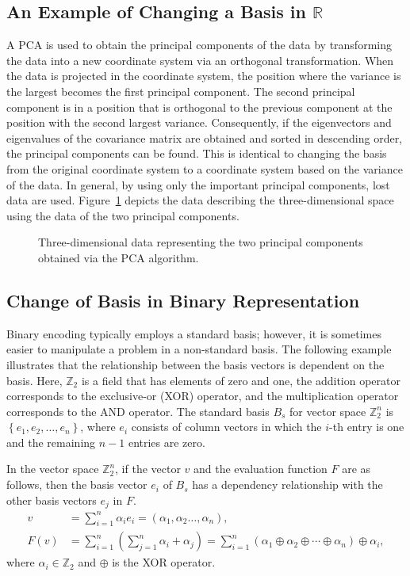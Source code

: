 \subsection{An Example of Changing a Basis in $\mathbb{R}$}
A PCA is used to obtain the principal components of the data by transforming the data into a new coordinate system via an orthogonal transformation. When the data is projected in the coordinate system, the position where the variance is the largest becomes the first principal component. The second principal component is in a position that is orthogonal to the previous component at the position with the second largest variance. Consequently, if the eigenvectors and eigenvalues of the covariance matrix are obtained and sorted in descending order, the principal components can be found. This is identical to changing the basis from the original coordinate system to a coordinate system based on the variance of the data. In general, by using only the important principal components, lost data are used. Figure~\ref{fig:pca} depicts the data describing the three-dimensional space using the data of the two principal components.

\begin{figure} [ht!]
	\caption{Three-dimensional data representing the two principal components obtained via the PCA algorithm.} \label{fig:pca}
\end{figure}

\subsection{Change of Basis in Binary Representation} \label{sec22:cob}
Binary encoding typically employs a standard basis; however, it is sometimes easier to manipulate a problem in a non-standard basis. The following example illustrates that the relationship between the basis vectors is dependent on the basis. Here, $ \mathbb{Z}_2 $ is a field that has elements of zero and one, the addition operator corresponds to the exclusive-or (XOR) operator, and the multiplication operator corresponds to the AND operator. The standard basis $ B_s $ for vector space $ \mathbb{Z}_2^n $ is $ \left\{e_1,e_2,\ldots,e_n\right\} $, where $ e_i $ consists of column vectors in which the $ i $-th entry is one and the remaining $ n-1 $ entries are zero.

In the vector space $ \mathbb{Z}_2^n $, if the vector $ v $ and the evaluation function $ F $ are as follows, then the basis vector $ e_i $ of $ B_s $ has a dependency relationship with the other basis vectors $ e_j $ in $ F $.
\begin{align}
v&=\sum_{i=1}^{n}{\alpha_ie_i}=\left(\alpha_1,\alpha_2\ldots,\alpha_n\right), \\
F\left(v\right)&=\sum_{i=1}^{n}\left(\sum_{j=1}^{n}\alpha_i+\alpha_j\right)=\sum_{i=1}^{n}{\left(\alpha_1\oplus\alpha_2\oplus\cdots\oplus\alpha_n\right)\oplus\alpha_i},
\end{align}
where $ \alpha_i\in\mathbb{Z}_2 $ and $ \oplus $ is the XOR operator.

